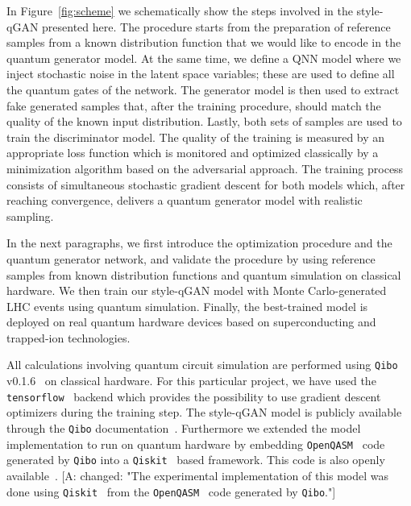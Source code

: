 \documentclass[twocolumn,preprintnumbers,superscriptaddress]{revtex4-2}
\newcommand{\commentAF}[1]{{\color{cyan} {[A: #1]}}}
\begin{document}
In Figure~\ref{fig:scheme} we schematically show the steps involved in the style-qGAN
presented here. The procedure starts from the preparation of reference samples from a
known distribution function that we would like to encode in the quantum
generator model. At the same time, we define a QNN model where
we inject stochastic noise in the latent space variables; these are used to
define all the quantum gates of the network. The generator model is then used to extract fake generated samples
that, after the training procedure, should match the quality of the known input
distribution. Lastly, both sets of samples are used to train the discriminator
model. The quality of the training is measured by an appropriate loss function
which is monitored and optimized classically by a minimization algorithm based on
the adversarial approach. The training process consists of simultaneous
stochastic gradient descent for both models which, after reaching convergence,
delivers a quantum generator model with realistic sampling.

In the next paragraphs, we first introduce the optimization procedure and the quantum
generator network, and validate the procedure by using reference samples from known
distribution functions and quantum simulation on classical hardware. We then
train our style-qGAN model with Monte Carlo-generated LHC events using quantum
simulation. Finally, the best-trained model is deployed on real quantum hardware
devices based on superconducting and trapped-ion technologies.

All calculations involving quantum circuit simulation are performed using
{\tt Qibo} v0.1.6~\cite{efthymiou2020qibo,stavros_efthymiou_2021_5088103} on
classical hardware. For this particular project, we have used the {\tt
tensorflow}~\cite{tensorflow2015-whitepaper} backend which provides the
possibility to use gradient descent optimizers during the training step. The
style-qGAN model is publicly available through the {\tt Qibo}
documentation~\cite{add_cite_tutorial}. Furthermore we extended the model implementation to run on quantum hardware by embedding {\tt OpenQASM}~\cite{cross2017open} code generated by {\tt Qibo} into a {\tt Qiskit}~\cite{gadi_aleksandrowicz_2019_2562111} based framework. This code is also openly available~\cite{add_cite_tutorial}.
\commentAF{changed: "The experimental implementation of this
model was done using {\tt Qiskit}~\cite{gadi_aleksandrowicz_2019_2562111} from
the {\tt OpenQASM}~\cite{cross2017open} code generated by {\tt Qibo}."}
\end{document}
